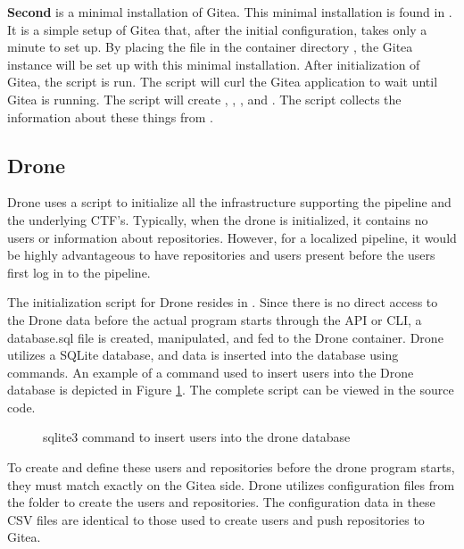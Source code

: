 \textbf{Second} is a minimal installation of Gitea. This minimal installation is found in . 
It is a simple setup of Gitea that, after the initial configuration, takes only a minute to set up. By placing the  file in the container 
directory \javaf{\data}, the Gitea instance will be set up with this minimal installation.
After initialization of Gitea, the script  is run.
The script will curl the Gitea application to wait until Gitea is running.
The script will create , , ,  and .
The script collects the information about these things from .

\subsection{Drone}
\label{sec:pipeline-local-drone}
Drone uses a script to initialize all the infrastructure supporting the pipeline and the underlying \ac{CTF}'s. 
Typically, when the drone is initialized, it contains no users or information about repositories. However, for a localized pipeline, 
it would be highly advantageous to have repositories and users present before the users first log in to the pipeline.

The initialization script for Drone resides in . 
Since there is no direct access to the Drone data before the actual program starts through the 
\ac{API} or \ac{CLI}, a database.sql file is created, manipulated, and fed to the Drone container.
Drone utilizes a SQLite database, and data is inserted into the database using  commands. 
An example of a command used to insert users into the Drone database is depicted in Figure \ref{fig:sqlite3-insert}. 
The complete script can be viewed in the source code.

\begin{figure}
    \begin{center}
    \end{center}
    \caption{sqlite3 command to insert users into the drone database}
    \label{fig:sqlite3-insert}
\end{figure}

To create and define these users and repositories before the drone program starts, 
they must match exactly on the Gitea side. 
Drone utilizes configuration files from the  
folder to create the users and repositories. The configuration data in these \ac{CSV} files are identical to those used to create users and push repositories to Gitea.

